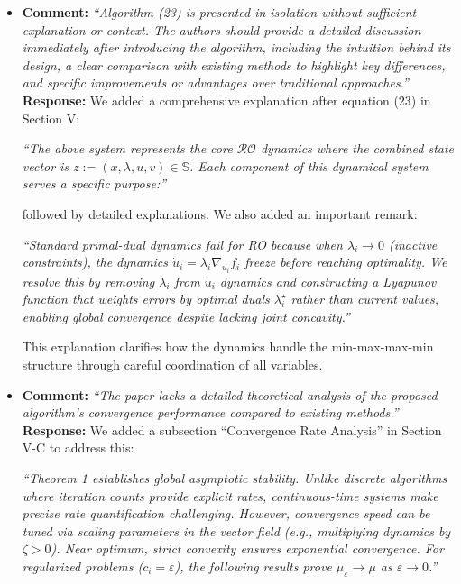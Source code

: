 \documentclass[journal,twoside,web]{ieeecolor}
\begin{document}
\begin{itemize}
\item \textbf{Comment:} \textit{``Algorithm (23) is presented in isolation without sufficient explanation or context. The authors should provide a detailed discussion immediately after introducing the algorithm, including the intuition behind its design, a clear comparison with existing methods to highlight key differences, and specific improvements or advantages over traditional approaches.''}\\ 

\textbf{Response:} We added a comprehensive explanation after equation (23) in Section V:

{\color{revisionblue}\textit{``The above system represents the core $\mathcal{RO}$ dynamics where the combined state vector is $z:=(x,\lambda,u,v) \in \mathbb{S}$. Each component of this dynamical system serves a specific purpose:''}}

followed by detailed explanations. We also added an important remark:

{\color{revisionblue}\textit{``Standard primal-dual dynamics fail for RO because when $\lambda_i \to 0$ (inactive constraints), the dynamics $\dot{u}_i = \lambda_i \nabla_{u_i} f_i$ freeze before reaching optimality. We resolve this by removing $\lambda_i$ from $\dot{u}_i$ dynamics and constructing a Lyapunov function that weights errors by optimal duals $\lambda_i^\star$ rather than current values, enabling global convergence despite lacking joint concavity.''}}

This explanation clarifies how the dynamics handle the min-max-max-min structure through careful coordination of all variables.\\

\item \textbf{Comment:} \textit{``The paper lacks a detailed theoretical analysis of the proposed algorithm's convergence performance compared to existing methods.''}\\

\textbf{Response:} We added a subsection ``Convergence Rate Analysis'' in Section V-C to address this:

{\color{revisionblue}\textit{``Theorem 1 establishes global asymptotic stability. Unlike discrete algorithms where iteration counts provide explicit rates, continuous-time systems make precise rate quantification challenging. However, convergence speed can be tuned via scaling parameters in the vector field (e.g., multiplying dynamics by $\zeta > 0$). Near optimum, strict convexity ensures exponential convergence. For regularized problems ($c_i = \varepsilon$), the following results prove $\mu_\varepsilon \to \mu$ as $\varepsilon \to 0$.''}}\\


\end{itemize}
\end{document}
